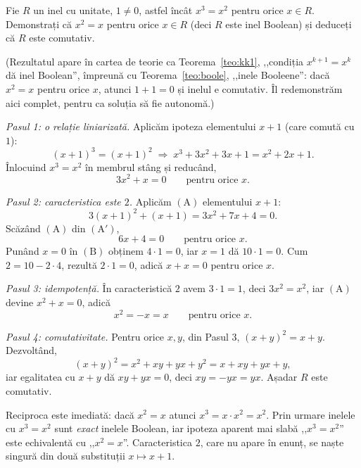 \begin{problema}
Fie $R$ un inel cu unitate, $1\neq 0$, astfel încât $x^{3}=x^{2}$
pentru orice $x\in R$. Demonstrați că $x^{2}=x$ pentru orice
$x\in R$ (deci $R$ este inel Boolean) și deduceți că $R$ este
comutativ.
\end{problema}

\begin{solutie}
(Rezultatul apare în cartea de teorie ca Teorema~\ref{teo:kk1}, ,,condiția
$x^{k+1}=x^{k}$ dă inel Boolean'', împreună cu Teorema~\ref{teo:boole},
,,inele Booleene'': dacă $x^{2}=x$ pentru orice $x$, atunci $1+1=0$
și inelul e comutativ. Îl redemonstrăm aici complet, pentru ca
soluția să fie autonomă.)

\smallskip
\textit{Pasul 1: o relație liniarizată.} Aplicăm ipoteza
elementului $x+1$ (care comută cu $1$):
\[
  (x+1)^{3}=(x+1)^{2}
  \;\Longrightarrow\;
  x^{3}+3x^{2}+3x+1 = x^{2}+2x+1 .
\]
Înlocuind $x^{3}=x^{2}$ în membrul stâng și reducând,
\begin{equation*}
  3x^{2}+x = 0 \qquad \text{pentru orice } x . \tag{A}
\end{equation*}

\textit{Pasul 2: caracteristica este $2$.} Aplicăm $(\mathrm{A})$
elementului $x+1$:
\begin{equation*}
  3(x+1)^{2}+(x+1) = 3x^{2}+7x+4 = 0 . \tag{A$'$}
\end{equation*}
Scăzând $(\mathrm{A})$ din $(\mathrm{A}')$,
\begin{equation*}
  6x+4 = 0 \qquad \text{pentru orice } x . \tag{B}
\end{equation*}
Punând $x=0$ în $(\mathrm{B})$ obținem $4\cdot 1=0$, iar $x=1$
dă $10\cdot 1=0$. Cum $2 = 10-2\cdot 4$, rezultă $2\cdot 1 = 0$,
adică $x+x=0$ pentru orice $x$.

\smallskip
\textit{Pasul 3: idempotență.} În caracteristică $2$ avem
$3\cdot 1 = 1$, deci $3x^{2}=x^{2}$, iar $(\mathrm{A})$ devine $x^{2}+x=0$,
adică
\[
  x^{2} = -x = x \qquad \text{pentru orice } x .
\]

\textit{Pasul 4: comutativitate.} Pentru orice $x,y$, din Pasul 3,
$(x+y)^{2}=x+y$. Dezvoltând,
\[
  (x+y)^{2} = x^{2}+xy+yx+y^{2} = x+xy+yx+y ,
\]
iar egalitatea cu $x+y$ dă $xy+yx=0$, deci $xy=-yx=yx$. Așadar $R$
este comutativ.
\end{solutie}

\begin{obs}
Reciproca este imediată: dacă $x^{2}=x$ atunci
$x^{3}=x\cdot x^{2}=x^{2}$. Prin urmare inelele cu $x^{3}=x^{2}$ sunt
\emph{exact} inelele Boolean, iar ipoteza aparent mai slabă
,,$x^{3}=x^{2}$'' este echivalentă cu ,,$x^{2}=x$''. Caracteristica
$2$, care nu apare în enunț, se naște singură din două
substituții $x\mapsto x+1$.
\end{obs}

